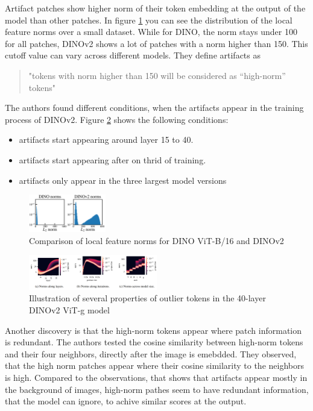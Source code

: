 \documentclass[conference]{IEEEtran}
\begin{document}
  Artifact patches show higher norm of their token embedding at the output of the model than other patches. In figure \ref{fig:artifacts-norm} you can see the distribution of the local feature norms over a small dataset. While for DINO, the norm stays under 100 for all patches, DINOv2 shows a lot of patches with a norm higher than 150. This cutoff value can vary across different models. They define artifacts as
  \begin{quote}
    "tokens with norm higher than 150 will be considered as “high-norm” tokens" \cite{registers}
  \end{quote}

  The authors found different conditions, when the artifacts appear in the training process of DINOv2. Figure \ref{fig:artifacts-layer} shows the following conditions:
  \begin{itemize}
    \item artifacts start appearing around layer 15 to 40.
    \item artifacts start appearing after on thrid of training.
    \item artifacts only appear in the three largest model versions
  \end{itemize}

  \begin{figure}
    \centering
    \includegraphics[width=0.3\textwidth]{figures/artifact-norm.png}
    \caption{Comparison of local feature norms for DINO ViT-B/16 and DINOv2 \cite{registers}}
    \label{fig:artifacts-norm}
  \end{figure}
  \begin{figure}
    \centering
    \includegraphics[width=0.5\textwidth]{figures/artifact-layers.png}
    \caption{Illustration of several properties of outlier tokens in the 40-layer DINOv2 ViT-g model \cite{registers}}
    \label{fig:artifacts-layer}
  \end{figure}

  Another discovery is that the high-norm tokens appear where patch information is redundant. The authors tested the cosine similarity between high-norm tokens and their four neighbors, directly after the image is emebdded. They observed, that the high norm patches appear where their cosine similarity to the neighbors is high. Compared to the observations, that shows that artifacts appear mostly in the background of images, high-norm pathes seem to have redundant information, that the model can ignore, to achive similar scores at the output.
\end{document}
